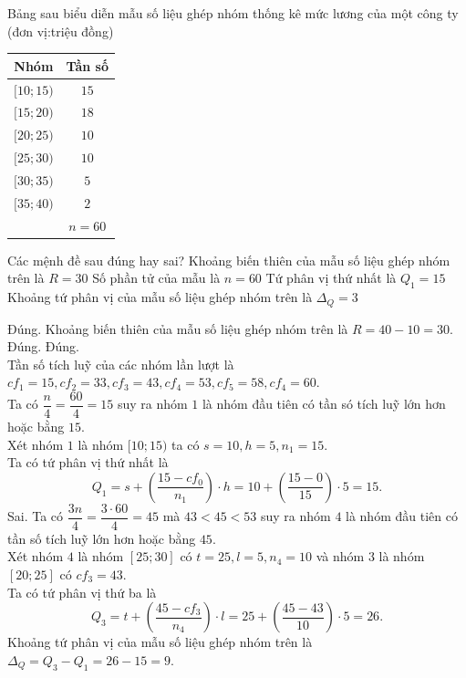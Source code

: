 \begin{ex}%
	Bảng sau biểu diễn mẫu số liệu ghép nhóm thống kê mức lương của một công ty (đơn vị:triệu đồng)
	\begin{center}
		\begin{tabular}{|c|c|}
			\hline Nhóm & Tần số \\
			\hline$[10 ; 15)$ & $15$ \\
			\hline$[15 ; 20)$ & $18$ \\
			\hline$[20 ; 25)$ & $10$ \\
			\hline$[25 ; 30)$ & $10$ \\
			\hline$[30 ; 35)$ & $5$ \\
			\hline$[35 ; 40)$ & $2$ \\
			\hline & $n=60$ \\
			\hline
		\end{tabular}
	\end{center}
	Các mệnh đề sau đúng hay sai?
	\choiceTF
	{\True Khoảng biến thiên của mẫu số liệu ghép nhóm trên là $R=30$}
	{\True Số phần tử của mẫu là $n=60$}
	{\True Tứ phân vị thứ nhất là $Q_1=15$}
	{ Khoảng tứ phân vị của mẫu số liệu ghép nhóm trên là $\Delta_Q=3$}
	\loigiai
	{
		\begin{itemchoice}
			\itemch Đúng. Khoảng biến thiên của mẫu số liệu ghép nhóm trên là $R=40-10=30$.
			\itemch Đúng. 
			\itemch Đúng. \\
			Tần số tích luỹ của các nhóm lần lượt là $c f_1=15, c f_2=33, c f_3=43, c f_4=53, c f_5=58, c f_4=60$.\\
			Ta có $\dfrac{n}{4}=\dfrac{60}{4}=15$ suy ra nhóm $1$ là nhóm đầu tiên có tần só tích luỹ lớn hơn hoặc bằng $15$.\\
			Xét nhóm $1$ là nhóm $[10 ; 15)$ ta có $s=10, h=5, n_1=15$.\\			
			Ta có tứ phân vị thứ nhất là $$Q_1=s+\left(\dfrac{15-c f_0}{n_1}\right) \cdot h=10+\left(\dfrac{15-0}{15}\right) \cdot 5=15.$$
			\itemch Sai. Ta có $\dfrac{3 n}{4}=\dfrac{3\cdot60}{4}=45$ mà $43<45<53$ suy ra nhóm $4$ là nhóm đầu tiên có tần số tích luỹ lớn hơn hoặc bằng $45$.\\
			Xét nhóm $4$ là nhóm $[25;30]$ có $t=25, l=5, n_4=10$ và nhóm $3$ là nhóm $[20;25]$ có $c f_3=43$.\\
			Ta có tứ phân vị thứ ba là $$Q_3=t+\left(\dfrac{45-c f_3}{n_4}\right) \cdot l=25+\left(\dfrac{45-43}{10}\right) \cdot 5=26.$$
			Khoảng tứ phân vị của mẫu số liệu ghép nhóm trên là $\Delta_Q=Q_3-Q_1=26-15=9$.
		\end{itemchoice}
	}
\end{ex}

